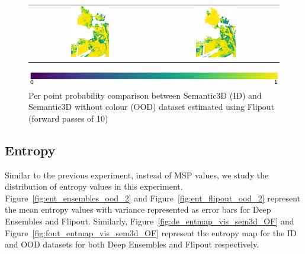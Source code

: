 \begin{figure}[h!]
\begin{tabular}{cc}
            \includegraphics[width=0.33\textwidth, height=0.18\textheight]{images/ood_imgs/fout_sem3d/fout_prob_3.pdf}&
            \includegraphics[width=0.33\textwidth, height=0.18\textheight]{images/sem3d_of/fout_prob_sem3d_of_3.pdf}\\
        \end{tabular}
        \includegraphics[scale=0.45]{images/prob_legend.pdf}
        \caption{Per point probability comparison between Semantic3D (ID) and Semantic3D without colour (OOD) dataset estimated using Flipout (forward passes of 10)}
        \label{fig:fout_probmap_vis_sem3d_OF}
    \end{figure} 
    \FloatBarrier


    \subsection{Entropy}
    Similar to the previous experiment, instead of MSP values, we study the distribution of entropy values in this experiment.
    Figure~\ref{fig:ent_ensembles_ood_2} and Figure~\ref{fig:ent_flipout_ood_2} represent the mean entropy values with variance represented as error bars for Deep Ensembles and Flipout.
    Similarly, Figure~\ref{fig:de_entmap_vis_sem3d_OF} and Figure~\ref{fig:fout_entmap_vis_sem3d_OF} represent the entropy map for the ID and OOD datasets for both Deep Ensembles and Flipout respectively.


